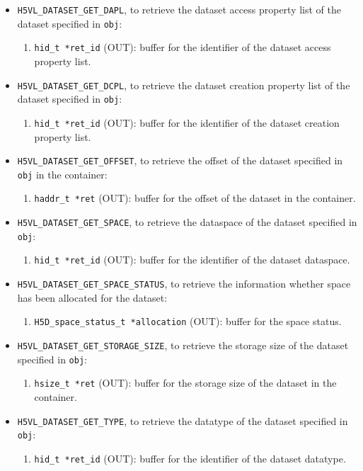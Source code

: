 \begin{itemize}
\item \texttt{H5VL\_DATASET\_GET\_DAPL}, to retrieve the dataset access
  property list of the dataset specified in \texttt{obj}:
  \begin{enumerate}
  \item \texttt{hid\_t *ret\_id} (OUT): buffer for the identifier of the
    dataset access property list.
  \end{enumerate}

\item \texttt{H5VL\_DATASET\_GET\_DCPL}, to retrieve the dataset creation
  property list of the dataset specified in \texttt{obj}:
  \begin{enumerate}
  \item \texttt{hid\_t *ret\_id} (OUT): buffer for the identifier of the
    dataset creation property list.
  \end{enumerate}

\item \texttt{H5VL\_DATASET\_GET\_OFFSET}, to retrieve the offset of the
  dataset specified in \texttt{obj} in the container:
  \begin{enumerate}
  \item \texttt{haddr\_t *ret} (OUT): buffer for the offset of the
    dataset in the container.
  \end{enumerate}

\item \texttt{H5VL\_DATASET\_GET\_SPACE}, to retrieve the dataspace of the
  dataset specified in \texttt{obj}:
  \begin{enumerate}
  \item \texttt{hid\_t *ret\_id} (OUT): buffer for the identifier of the
    dataset dataspace.
  \end{enumerate}

\item \texttt{H5VL\_DATASET\_GET\_SPACE\_STATUS}, to retrieve the
  information whether space has been allocated for the dataset:
  \begin{enumerate}
  \item \texttt{H5D\_space\_status\_t *allocation} (OUT): buffer for the
    space status.
  \end{enumerate}

\item \texttt{H5VL\_DATASET\_GET\_STORAGE\_SIZE}, to retrieve the storage
  size of the dataset specified in \texttt{obj}:
  \begin{enumerate}
  \item \texttt{hsize\_t *ret} (OUT): buffer for the storage size of
    the dataset in the container.
  \end{enumerate}

\item \texttt{H5VL\_DATASET\_GET\_TYPE}, to retrieve the datatype of the
  dataset specified in \texttt{obj}:
  \begin{enumerate}
  \item \texttt{hid\_t *ret\_id} (OUT): buffer for the identifier of the
    dataset datatype.
  \end{enumerate}
\end{itemize}

